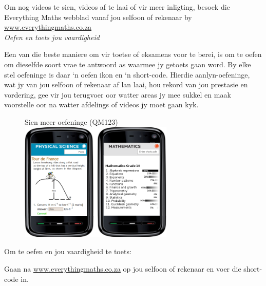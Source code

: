 \newpage
\thispagestyle{empty}
{

Om nog videos te sien, videos af te laai of vir meer inligting, besoek die Everything Maths webblad vanaf jou selfoon of rekenaar by \underline{www.everythingmaths.co.za}  
\vspace*{1cm}
\\
{\normalfont\sffamily\fontsize{22}\normalfont\itshape Oefen en toets jou vaardigheid} \par


Een van die beste maniere om vir toetse of eksamens voor te berei, is om te oefen om dieselfde soort vrae te antwoord as waarmee jy getoets gaan word. By elke stel oefeninge is daar ‘n oefen ikon en ‘n short-code. Hierdie aanlyn-oefeninge, wat jy van jou selfoon of rekenaar af lan laai, hou rekord van jou prestasie en vordering, gee vir jou terugvoer oor watter areas jy mee sukkel en maak voorstelle oor na watter afdelings of videos jy moet gaan kyk.


\begin{figure}[h]
\begin{center}
Sien meer oefeninge   (QM123)\\ 
\includegraphics[width=0.65\textwidth]{title_images/practicephones.png}
\end{center}
\end{figure}
\par


Om te oefen en jou vaardigheid te toets:\par

Gaan na \underline{www.everythingmaths.co.za} op jou selfoon of rekenaar en voer die short-code in.\partykeer
\vspace*{1cm}

}
